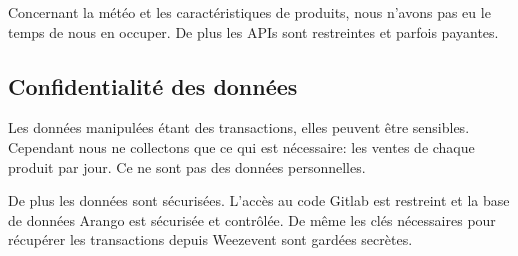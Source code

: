 Concernant la météo et les caractéristiques de produits, nous n'avons pas eu le temps de nous en occuper. De plus les APIs sont restreintes et parfois payantes.


\subsection{Confidentialité des données}
\label{subsec:rgpb}

Les données manipulées étant des transactions, elles peuvent être sensibles. Cependant nous ne collectons que ce qui est nécessaire: les ventes de chaque produit par jour. Ce ne sont pas des données personnelles.

De plus les données sont sécurisées. L'accès au code Gitlab est restreint et la base de données Arango est sécurisée et contrôlée. De même les clés nécessaires pour récupérer les transactions depuis Weezevent sont gardées secrètes.

